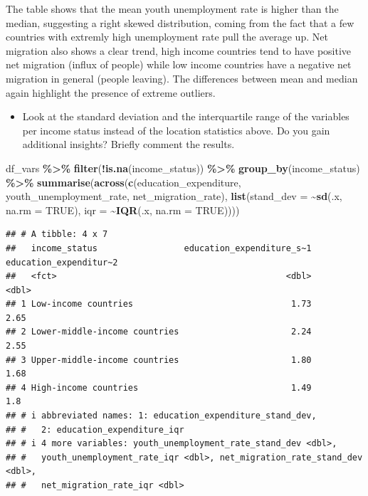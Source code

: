 \documentclass[
]{article}
\newenvironment{Shaded}{\begin{snugshade}}{\end{snugshade}}
\newcommand{\AttributeTok}[1]{\textcolor[rgb]{0.13,0.29,0.53}{#1}}
\newcommand{\ConstantTok}[1]{\textcolor[rgb]{0.56,0.35,0.01}{#1}}
\newcommand{\FunctionTok}[1]{\textcolor[rgb]{0.13,0.29,0.53}{\textbf{#1}}}
\newcommand{\NormalTok}[1]{#1}
\newcommand{\SpecialCharTok}[1]{\textcolor[rgb]{0.81,0.36,0.00}{\textbf{#1}}}
\providecommand{\tightlist}{%
  \setlength{\itemsep}{0pt}\setlength{\parskip}{0pt}}
\begin{document}
The table shows that the mean youth unemployment rate is higher than the
median, suggesting a right skewed distribution, coming from the fact
that a few countries with extremly high unemployment rate pull the
average up. Net migration also shows a clear trend, high income
countries tend to have positive net migration (influx of people) while
low income countries have a negative net migration in general (people
leaving). The differences between mean and median again highlight the
presence of extreme outliers.

\begin{itemize}
\tightlist
\item
  Look at the standard deviation and the interquartile range of the
  variables per income status instead of the location statistics above.
  Do you gain additional insights? Briefly comment the results.
\end{itemize}

\begin{Shaded}
\begin{Highlighting}[]
\NormalTok{df\_vars }\SpecialCharTok{\%\textgreater{}\%}
  \FunctionTok{filter}\NormalTok{(}\SpecialCharTok{!}\FunctionTok{is.na}\NormalTok{(income\_status)) }\SpecialCharTok{\%\textgreater{}\%}
  \FunctionTok{group\_by}\NormalTok{(income\_status) }\SpecialCharTok{\%\textgreater{}\%}
  \FunctionTok{summarise}\NormalTok{(}\FunctionTok{across}\NormalTok{(}\FunctionTok{c}\NormalTok{(education\_expenditure, youth\_unemployment\_rate, net\_migration\_rate),}
                   \FunctionTok{list}\NormalTok{(}\AttributeTok{stand\_dev =} \SpecialCharTok{\textasciitilde{}}\FunctionTok{sd}\NormalTok{(.x, }\AttributeTok{na.rm =} \ConstantTok{TRUE}\NormalTok{),}
                        \AttributeTok{iqr =} \SpecialCharTok{\textasciitilde{}}\FunctionTok{IQR}\NormalTok{(.x, }\AttributeTok{na.rm =} \ConstantTok{TRUE}\NormalTok{))))}
\end{Highlighting}
\end{Shaded}

\begin{verbatim}
## # A tibble: 4 x 7
##   income_status                 education_expenditure_s~1 education_expenditur~2
##   <fct>                                             <dbl>                  <dbl>
## 1 Low-income countries                               1.73                   2.65
## 2 Lower-middle-income countries                      2.24                   2.55
## 3 Upper-middle-income countries                      1.80                   1.68
## 4 High-income countries                              1.49                   1.8 
## # i abbreviated names: 1: education_expenditure_stand_dev,
## #   2: education_expenditure_iqr
## # i 4 more variables: youth_unemployment_rate_stand_dev <dbl>,
## #   youth_unemployment_rate_iqr <dbl>, net_migration_rate_stand_dev <dbl>,
## #   net_migration_rate_iqr <dbl>
\end{verbatim}
\end{document}
